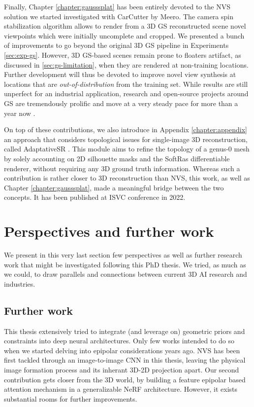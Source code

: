 Finally, Chapter \ref{chapter:gausssplat} has been entirely devoted to the \ac{NVS} solution we started investigated with CarCutter by Meero. The camera spin stabilization algorithm allows to render from a 3D \ac{GS} reconstructed scene novel viewpoints which were initially uncomplete and cropped. We presented a bunch of improvements to go beyond the original 3D \ac{GS} pipeline in Experiments \ref{sec:exp-gs}. However, 3D \ac{GS}-based scenes remain prone to floaters artifact, as discussed in \ref{sec:gs-limitation}, when they are rendered at non-training locations. Further development will thus be devoted to improve novel view synthesis at locations that are \textit{out-of-distribution} from the training set. While results are still unperfect for an industrial application, research and open-source projects around \ac{GS} \citep{kerbl20233d} are tremendously prolific and move at a very steady pace for more than a year now \citep{luiten2023dynamic,yang2024gaussianobject,wewer24latentsplat}. 

On top of these contributions, we also introduce in Appendix \ref{chapter:appendix} an approach that considers topological issues for single-image 3D reconstruction, called AdaptativeSR \citep{landreau2022adaptativesr}. This module aims to refine the topology of a genus-0 mesh by solely accounting on 2D silhouette masks and the SoftRas \citep{liu2019soft} differentiable renderer, without requiring any 3D ground truth information. Whereas such a contribution is rather closer to 3D reconstruction than \ac{NVS}, this work, as well as Chapter \ref{chapter:gausssplat}, made a meaningful bridge between the two concepts. It has been published at ISVC conference in 2022.

\section{Perspectives and further work}
We present in this very last section few perspectives as well as further research work that might be investigated following this PhD thesis. We tried, as much as we could, to draw parallels and connections between current 3D \ac{AI} research and industries. 

\subsection{Further work}
This thesis extensively tried to integrate (and leverage on) geometric priors and constraints into deep neural architectures. Only few works intended to do so when we started delving into epipolar considerations years ago. \ac{NVS} has been first tackled through an image-to-image \ac{CNN} in this thesis, leaving the physical image formation process and its inherant 3D-2D projection apart. Our second contribution gets closer from the 3D world, by building a feature epipolar based attention mechanism in a generalizable \ac{NeRF} architecture. However, it exists substantial rooms for further improvements. 

